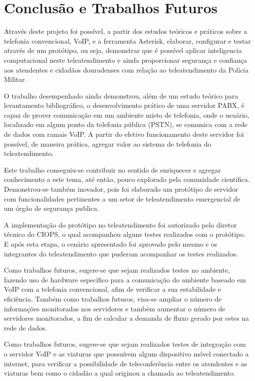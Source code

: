 
\chapter{Conclusão e Trabalhos Futuros} %
Através deste projeto foi possível, a partir dos estudos teóricos e práticos sobre a telefonia convencional, VoIP, e a ferramenta Asterisk, elaborar, configurar e testar através de um protótipo, ou seja, demonstrar que é possível aplicar inteligencia computacional neste teleatendimento e ainda proporcionar segurança e confiança aos atendentes e cidadãos douradenses com relação ao teleatendimento da Polícia Militar.

O trabalho desempenhado ainda demonstrou, além de um estudo teórico para levantamento bibliográfico, o desenvolvimento prático de uma servidor PABX, é capaz de prover comunicação em um ambiente misto de telefonia, onde o usuário, localizado em algum ponto da telefonia pública (PSTN), se comunica com a rede de dados com ramais VoIP. A partir do efetivo funcionamento deste servidor foi possível, de maneira prática, agregar valor ao sistema de telefonia do teleatendimento.

Este trabalho conseguiu-se contribuir no sentido de enriquecer e agregar conhecimento a este tema, até então, pouco explorado pela comunidade científica. Demonstrou-se também inovador, pois foi elaborado um protótipo de servidor com funcionalidades pertinentes a um setor de teleatendimento emergencial de um órgão de segurança publica.

A implementação do protótipo no teleatendimento foi autorizado pelo diretor técnico do CIOPS, o qual acompanhou alguns testes realizados com o protótipo. E após esta etapa, o cenário apresentado foi aprovado pelo mesmo e os integrantes do teleatendimento que puderam acompanhar os testes realizados.

Como trabalhos futuros, sugere-se que sejam realizados testes no ambiente, fazendo uso de hardware específico para a comunicação do ambiente baseado em VoIP com a telefonia convencional, afim de verificar a sua estabilidade e eficiência. Também como trabalhos futuros, visa-se ampliar o número de informações monitoradas nos servidores e também aumentar o número de servidores monitorados, a fim de calcular a demanda de fluxo gerado por estes na
rede de dados.

Como trabalhos futuros, sugere-se que sejam realizados testes de integração com o servidor VoIP e as viaturas que possuírem algum dispositivo móvel conectado a internet, para verificar a possibilidade de teleconferência entre os atendentes e as viaturas bem como o cidadão a qual originou a chamada ao teleatendimento.

